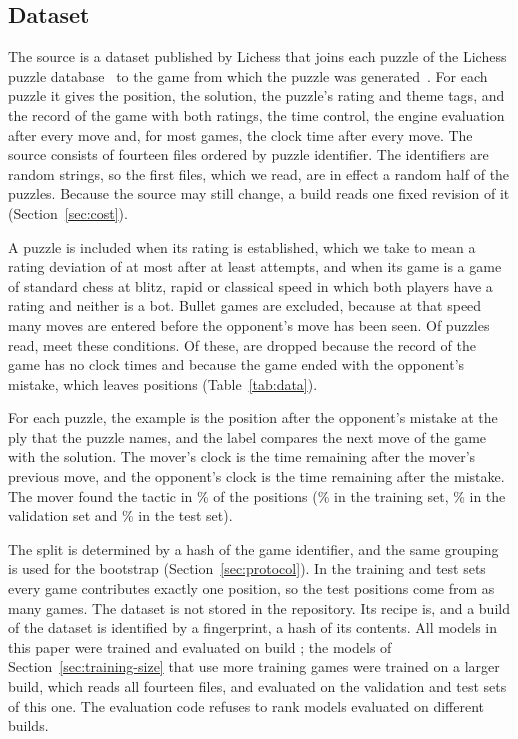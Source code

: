 \documentclass[11pt]{article}
\begin{document}
\subsection{Dataset}

The source is a dataset published by Lichess that joins each puzzle of the
Lichess puzzle database~\cite{lichessdb} to the game from which the puzzle
was generated~\cite{puzzlegames}. For each puzzle it gives the position, the
solution, the puzzle's rating and theme tags, and the record of the game with
both ratings, the time control, the engine evaluation after every move and,
for most games, the clock time after every move. The source consists of fourteen files ordered by puzzle
identifier. The identifiers are random strings, so the first
 files, which we read, are in effect a random half of the
puzzles. Because the source may still change, a build reads one fixed
revision of it (Section~\ref{sec:cost}).

A puzzle is included when its rating is established, which we take to mean a
rating deviation of at most  after at
least  attempts, and when its game is a game of
standard chess at blitz, rapid or classical speed in which both players have
a rating and neither is a bot. Bullet games are excluded, because at that
speed many moves are entered before the opponent's move has been seen. Of
 puzzles read,  meet
these conditions. Of these,  are dropped because
the record of the game has no clock times and 
because the game ended with the opponent's mistake, which leaves
 positions (Table~\ref{tab:data}).

For each puzzle, the example is the position after the opponent's mistake at
the ply that the puzzle names, and the label compares the next move of the
game with the solution. The mover's clock is the time remaining after the
mover's previous move, and the opponent's clock is the time remaining after
the mistake. The mover found the tactic in \% of the positions
(\% in the training set, \% in the
validation set and \% in the test set).

The split is determined by a hash of the game identifier, and the same
grouping is used for the bootstrap (Section~\ref{sec:protocol}). In the
training and test sets every game contributes exactly one position, so the
 test positions come from as many games. The dataset is not
stored in the repository. Its recipe is, and a build of the dataset is
identified by a fingerprint, a hash of its contents. All models in this paper
were trained and evaluated on build \ifmore; the models
of Section~\ref{sec:training-size} that use more training games were trained
on a larger build, which reads all fourteen files, and evaluated on the
validation and test sets of this one\fi. The evaluation code refuses to rank
models evaluated on different builds.
\end{document}
